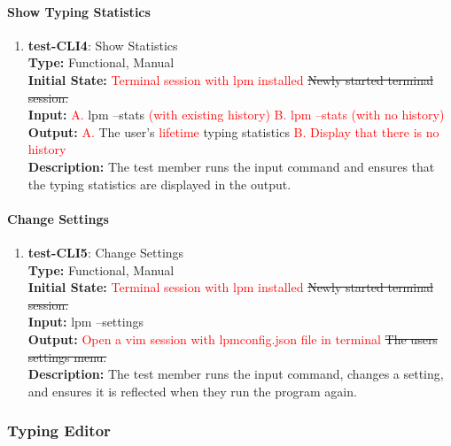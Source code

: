 \documentclass[12pt, titlepage]{article}
\begin{document}
\paragraph{Show Typing Statistics}
\begin{enumerate}

\item{\textbf{test-CLI4}: Show Statistics\\}
\textbf{Type:} Functional, Manual \\
\textbf{Initial State:} \textcolor{red}{Terminal session with lpm installed} \sout{Newly started terminal session.} \\
\textbf{Input:} \textcolor{red}{A.} lpm --stats \textcolor{red}{(with existing history) B. lpm --stats (with no history)  } \\
\textbf{Output:} \textcolor{red}{A.} The user's \textcolor{red}{lifetime} typing statistics \textcolor{red}{B. Display that there is no history} \\
\textbf{Description:} The test member runs the input command and ensures that the typing statistics are displayed in the output. \\

\end{enumerate}

\paragraph{Change Settings}
\begin{enumerate}

\item{\textbf{test-CLI5}: Change Settings\\}
\textbf{Type:} Functional, Manual \\
\textbf{Initial State:} \textcolor{red}{Terminal session with lpm installed} \sout{Newly started terminal session.} \\
\textbf{Input:} lpm --settings \\
\textbf{Output:} \textcolor{red}{Open a vim session with lpmconfig.json file in terminal} \sout{The users settings menu.} \\
\textbf{Description:} The test member runs the input command, changes a setting, and ensures it is reflected when they run the program again. \\

\end{enumerate}

\subsubsection{Typing Editor}
\end{document}
